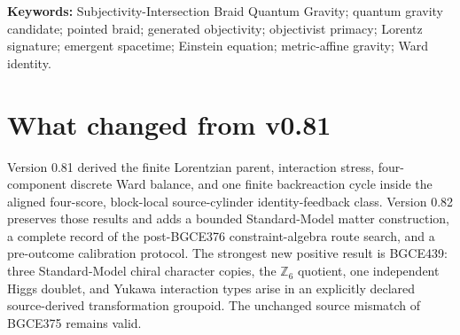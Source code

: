 \documentclass[11pt]{article}
\theoremstyle{definition}
\theoremstyle{remark}
\begin{document}
\noindent\textbf{Keywords:} Subjectivity-Intersection Braid Quantum Gravity; quantum gravity candidate; pointed braid; generated objectivity; objectivist primacy; Lorentz signature; emergent spacetime; Einstein equation; metric-affine gravity; Ward identity.

\section{What changed from v0.81}

Version 0.81 derived the finite Lorentzian parent, interaction stress, four-component discrete Ward balance, and one finite backreaction cycle inside the aligned four-score, block-local source-cylinder identity-feedback class. Version 0.82 preserves those results and adds a bounded Standard-Model matter construction, a complete record of the post-BGCE376 constraint-algebra route search, and a pre-outcome calibration protocol. The strongest new positive result is BGCE439: three Standard-Model chiral character copies, the $\mathbb Z_6$ quotient, one independent Higgs doublet, and Yukawa interaction types arise in an explicitly declared source-derived transformation groupoid. The unchanged source mismatch of BGCE375 remains valid.
\end{document}
